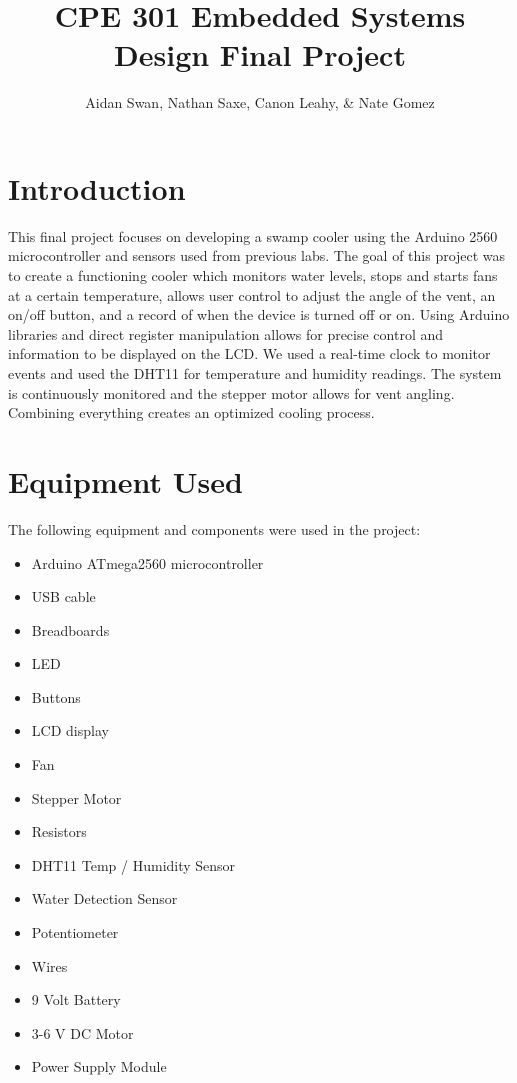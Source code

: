 \documentclass{article}
\title{CPE 301 Embedded Systems Design Final Project}
\author{Aidan Swan, Nathan Saxe, Canon Leahy, & Nate Gomez}
\begin{document}
\maketitle
\section{Introduction}
This final project focuses on developing a swamp cooler using the Arduino 2560 microcontroller and sensors used from previous labs. The goal of this project was to create a functioning cooler which monitors water levels, stops and starts fans at a certain temperature, allows user control to adjust the angle of the vent, an on/off button, and a record of when the device is turned off or on. Using Arduino libraries and direct register manipulation allows for precise control and information to be displayed on the LCD. We used a real-time clock to monitor events and used the DHT11 for temperature and humidity readings. The system is continuously monitored and  the stepper motor allows for vent angling. Combining everything creates an optimized cooling process. 

\section{Equipment Used}
The following equipment and components were used in the project:
\begin{itemize}
    \item Arduino ATmega2560 microcontroller
    \item USB cable
    \item Breadboards
    \item LED
    \item Buttons
    \item LCD display
    \item Fan
    \item Stepper Motor
    \item Resistors
    \item DHT11 Temp / Humidity Sensor
    \item Water Detection Sensor
    \item Potentiometer
    \item Wires
    \item 9 Volt Battery
    \item 3-6 V DC Motor
    \item Power Supply Module
\end{itemize}
\end{document}
